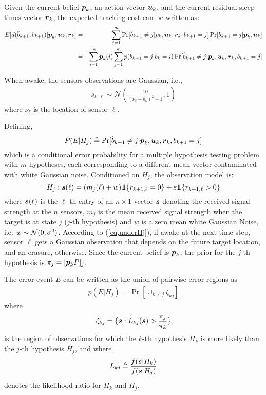 \documentclass[journal,draftcls,onecolumn,11pt]{IEEEtran}
\newcommand{\emb}[1]{\text{\boldmath{$#1$}}}
\newcommand{\indic}[1]{\mbox{$1\!\!1$}{\{#1\}}}
\begin{document}
Given the current belief $\emb{p}_k$, an action vector $\emb{u}_k$, and the current residual sleep times vector $\emb{r}_k$, the expected tracking cost can be written as:
\begin{eqnarray}
E[d(\hat{b}_{k+1},b_{k+1})|\emb{p}_k,\emb{u}_k,\emb{r}_k]&=& \sum_{j=1}^m \Pr[\hat{b}_{k+1}\ne j|p_k,\emb{u}_k, \emb{r}_k, b_{k+1}=j]\Pr[b_{k+1}=j|\emb{p}_k,\emb{u}_k]\nonumber\\
&=& \sum_{i=1}^m \emb{p}_k(i)\sum_{j=1}^m p(b_{k+1}=j|b_k=i)\Pr[\hat{b}_{k+1}\ne j|\emb{p}_k,\emb{u}_k,\emb{r}_k,b_{k+1}=j]\nonumber\\
\end{eqnarray}

When awake, the sensors observations are Gaussian, i.e.,
\begin{align}\label{eq:gaussian_obs}
   s_{k,\ell} \sim \mathcal{N}\left(
      \frac{10}{(\nu_\ell - b_k)^2 + 1},1
   \right)
\end{align}
where $\nu_\ell$ is the location of sensor $\ell$.

Defining,
\[
P(E|H_j)\triangleq \Pr[\hat{b}_{k+1}\ne j|\emb{p}_k,\emb{u}_k,\emb{r}_k,b_{k+1}=j]
\]
which is a conditional error probability for a multiple hypothesis testing problem with $m$ hypotheses, each corresponding to a different mean vector contaminated with white Gaussian noise. Conditioned on $H_j$, the observation model is:
\begin{equation}
H_j: \emb{s}(\ell) = (m_j(\ell) + w)\indic{r_{k+1,\ell}=0} + \varepsilon \indic{r_{k+1,\ell}>0}
\label{eq,underHj}
\end{equation}
where $\emb{s}(\ell)$ is the $\ell$-th entry of an $n\times 1$ vector $\emb{s}$ denoting the received signal strength at the $n$ sensors, $m_j$ is the mean received signal strength when the target is at state $j$ ($j$-th hypothesis) and $w$ is a zero mean white Gaussian Noise, i.e. $w\sim {\cal N}(0,\sigma^2)$. According to (\ref{eq,underHj}), if awake at the next time step, sensor $\ell$ gets a Gaussian observation that depends on the future target location, and an erasure, otherwise. Since the current belief is $\emb{p}_k$, the prior for the $j$-th hypothesis is $\pi_j=[\emb{p}_k P]_j$.

The error event $E$ can be written as the union of pairwise error regions as
\begin{eqnarray}
p(E|H_j) = \Pr[\cup_{k\ne j}\zeta_{kj}]
\end{eqnarray}
where \[\zeta_{kj}= \{\emb{s}:L_{kj}(\emb{s})>\frac{\pi_j}{\pi_k}\}\]
is the region of observations for which the $k$-th hypothesis $H_k$ is more likely than the $j$-th hypothesis $H_j$, and where
\[
L_{kj}\triangleq \frac{f(\emb{s}|H_k)}{f(\emb{s}|H_j)}
\]
denotes the likelihood ratio for $H_k$ and $H_j$.
\end{document}
